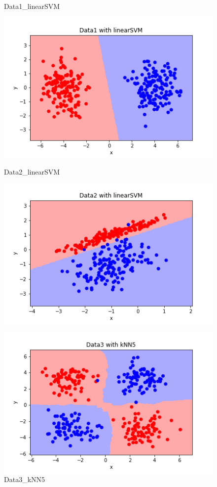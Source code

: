 \begin{figure}[htbp]
  \begin{minipage}[t]{0.24\hsize}
    \centering
    \caption{Data1\_linearSVM}
    \label{graph:1}
    \includegraphics[keepaspectratio, scale=0.3]{fig_20210629132055/Data1_linearSVM.png}
  \end{minipage}
  \begin{minipage}[t]{0.24\hsize}
    \centering
    \caption{Data2\_linearSVM}
    \label{graph:2}
    \includegraphics[keepaspectratio, scale=0.3]{fig_20210629132055/Data2_linearSVM.png}
  \end{minipage}
  \begin{minipage}[t]{0.24\hsize}
    \centering
    \caption{Data3\_kNN5}
    \label{graph:3}
    \includegraphics[keepaspectratio, scale=0.3]{fig_20210629132055/Data3_kNN5.png}

\end{minipage}
\end{figure}
